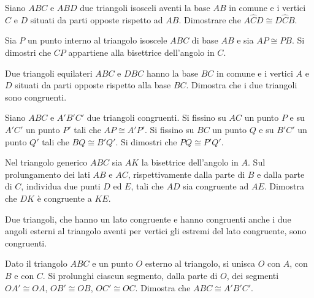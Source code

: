 \begin{multicols}{2}
\begin{esercizio}
\label{ese:2.69}
Siano $ABC$ e $ABD$ due triangoli isosceli aventi la base $AB$ in comune e i vertici $C$ e $D$ situati da parti opposte rispetto ad $AB$. Dimostrare che $A\widehat{C}D\cong D\widehat{C}B$.
\end{esercizio}

\begin{esercizio}
\label{ese:2.70}
Sia $P$ un punto interno al triangolo isoscele $ABC$ di base $AB$ e sia $AP\cong PB$. Si dimostri che $CP$ appartiene alla bisettrice dell'angolo in $C$.
\end{esercizio}

\begin{esercizio}
\label{ese:2.71}
Due triangoli equilateri $ABC$ e $DBC$ hanno la base $BC$ in comune e i vertici $A$ e $D$ situati da parti opposte rispetto alla base $BC$. Dimostra che i due triangoli sono congruenti.
\end{esercizio}

\begin{esercizio}
\label{ese:2.72}
Siano $ABC$ e $A'B'C'$ due triangoli congruenti. Si fissino su $AC$ un punto $P$ e su $A'C'$ un punto $P'$ tali che $AP\cong A'P'$. Si fissino su $BC$ un punto $Q$ e su $B'C'$ un punto $Q'$ tali che $BQ\cong B'Q'$. Si dimostri che $PQ\cong P'Q'$.
\end{esercizio}

\begin{esercizio}
\label{ese:2.73}
Nel triangolo generico $ABC$ sia $AK$ la bisettrice dell'angolo in $A$. Sul prolungamento dei lati $AB$ e $AC$, rispettivamente dalla parte di $B$ e dalla parte di $C$, individua due punti $D$ ed $E$, tali che $AD$ sia congruente ad $AE$. Dimostra che $DK$ è congruente a $KE$.
\end{esercizio}

\begin{esercizio}
\label{ese:2.74}
Due triangoli, che hanno un lato congruente e hanno congruenti anche i due angoli esterni al triangolo aventi per vertici gli estremi del lato congruente, sono congruenti. 
\end{esercizio}

\begin{esercizio}
\label{ese:2.75}
Dato il triangolo $ABC$ e un punto $O$ esterno al triangolo, si unisca $O$ con $A$, con $B$ e con $C$. Si prolunghi ciascun segmento, dalla parte di $O$, dei segmenti $OA'\cong OA$, $OB'\cong OB$, $OC'\cong OC$. Dimostra che $ABC\cong A'B'C'$.
\end{esercizio}


\end{multicols}
